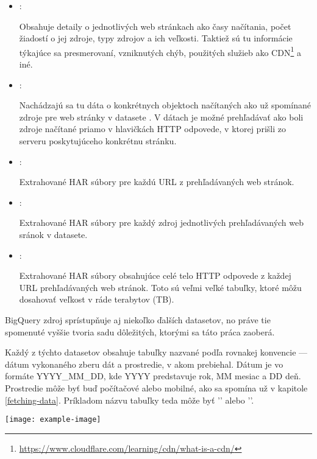 \begin{itemize}
    \item {}:

    Obsahuje detaily o jednotlivých web stránkach ako časy načítania, počet žiadostí o jej zdroje, typy zdrojov a ich veľkosti.
    Taktiež sú tu informácie týkajúce sa presmerovaní, vzniknutých chýb, použitých služieb ako CDN\footnote{\href{https://www.cloudflare.com/learning/cdn/what-is-a-cdn/}{https://www.cloudflare.com/learning/cdn/what-is-a-cdn/}} a iné.
    
    \item {}:

    Nachádzajú sa tu dáta o konkrétnych objektoch načítaných ako už spomínané zdroje pre web stránky v datasete .
    V dátach je možné prehľadávať ako boli zdroje načítané priamo v hlavičkách HTTP odpovede, v ktorej prišli zo serveru poskytujúceho konkrétnu stránku.
    
    \item {}:

    Extrahované HAR súbory pre každú URL z prehľadávaných web stránok.
    
    \item {}:

    Extrahované HAR súbory pre každý zdroj jednotlivých prehľadávaných web sránok v  datasete.
    
    \item {}:

    Extrahované HAR súbory obsahujúce celé telo HTTP odpovede z každej URL prehľadávaných web stránok.
    Toto sú veľmi veľké tabuľky, ktoré môžu dosahovať veľkost v ráde terabytov (TB).
\end{itemize}

BigQuery zdroj  sprístupňuje aj niekoľko ďalších datasetov, no práve tie spomenuté vyššie tvoria sadu dôležitých, ktorými sa táto práca zaoberá. 

Každý z týchto datasetov obsahuje tabuľky nazvané podľa rovnakej konvencie --- dátum vykonaného zberu dát a prostredie, v akom prebiehal.
Dátum je vo formáte YYYY\_MM\_DD, kde YYYY predstavuje rok, MM mesiac a DD deň. Prostredie môže byť buď počítačové alebo mobilné, ako sa spomína už v kapitole \ref{fetching-data}.
Príkladom názvu tabuľky teda môže byť '' alebo ''.

\begin{center}
\noindent\texttt{[image: example-image]}    
\end{center}

